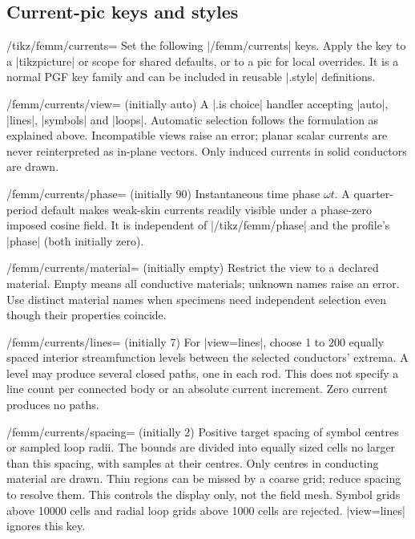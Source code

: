 \subsection{Current-pic keys and styles}
\begin{key}{/tikz/femm/currents=}
Set the following |/femm/currents| keys. Apply the key to a |tikzpicture| or
scope for shared defaults, or to a pic for local overrides. It is a normal
PGF key family and can be included in reusable |.style| definitions.
\end{key}
\begin{key}{/femm/currents/view= (initially auto)}
A |.is choice| handler accepting |auto|, |lines|, |symbols| and |loops|.
Automatic selection follows the formulation as explained above. Incompatible
views raise an error; planar scalar currents are never reinterpreted as
in-plane vectors. Only induced currents in solid conductors are drawn.
\end{key}
\begin{key}{/femm/currents/phase= (initially 90)}
Instantaneous time phase $\omega t$. A quarter-period default makes weak-skin
currents readily visible under a phase-zero imposed cosine field. It is
independent of |/tikz/femm/phase| and the profile's |phase| (both initially zero).
\end{key}
\begin{key}{/femm/currents/material= (initially empty)}
Restrict the view to a declared material. Empty means all conductive materials;
unknown names raise an error. Use distinct material names when specimens need
independent selection even though their properties coincide.
\end{key}
\begin{key}{/femm/currents/lines= (initially 7)}
For |view=lines|, choose 1 to 200 equally spaced interior streamfunction levels
between the selected conductors' extrema. A level may produce several closed
paths, one in each rod. This does not specify a line count per connected body
or an absolute current increment. Zero current produces no paths.
\end{key}
\begin{key}{/femm/currents/spacing= (initially 2)}
Positive target spacing of symbol centres or sampled loop radii. The bounds
are divided into equally sized cells no larger than this spacing, with samples
at their centres. Only centres in conducting material are drawn. Thin regions
can be missed by a coarse grid; reduce spacing to resolve them. This controls
the display only, not the field mesh. Symbol grids above 10000 cells and radial
loop grids above 1000 cells are rejected. |view=lines| ignores this key.
\end{key}
